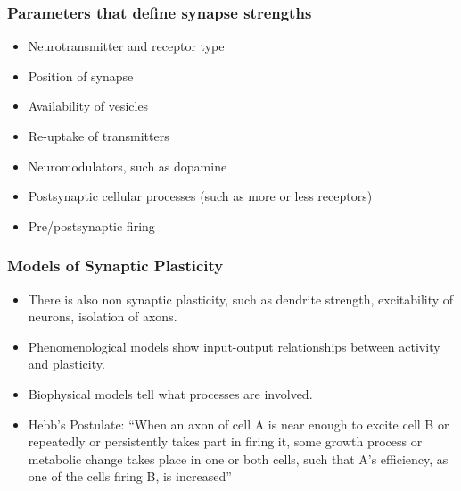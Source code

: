 \documentclass[main]{subfiles}
\begin{document}
\subsubsection{Parameters that define synapse strengths}
\begin{itemize}[noitemsep,nolistsep]
	\item Neurotransmitter and receptor type
	\item Position of synapse
	\item Availability of vesicles
	\item Re-uptake of transmitters
	\item Neuromodulators, such as dopamine
	\item Postsynaptic cellular processes (such as more or less receptors)
	\item Pre/postsynaptic firing
\end{itemize}

\subsubsection{Models of Synaptic Plasticity}
\begin{itemize}[noitemsep,nolistsep]
	\item There is also non synaptic plasticity, such as dendrite strength, excitability of neurons, isolation of axons.
	\item Phenomenological models show input-output relationships between activity and plasticity.
	\item Biophysical models tell what processes are involved.
	\item Hebb's Postulate: ``When an axon of cell A is near enough to excite cell B or repeatedly or persistently takes part in firing it, some growth process or metabolic change takes place in one or both cells, such that A's efficiency, as one of the cells firing B, is increased''
\end{itemize}
\end{document}
